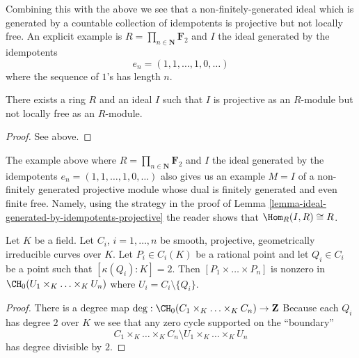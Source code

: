 \medskip\noindent
Combining this with the above we see that a non-finitely-generated
ideal which is generated by a countable collection of idempotents
is projective but not locally free. An explicit example is
$R = \prod_{n \in \mathbf{N}} \mathbf{F}_2$ and
$I$ the ideal generated by the idempotents
$$
e_n = (1, 1, \ldots, 1, 0, \ldots )
$$
where the sequence of $1$'s has length $n$.

\begin{lemma}
\label{lemma-ideal-projective-not-locally-free}
There exists a ring $R$ and an ideal $I$ such that $I$ is projective as
an $R$-module but not locally free as an $R$-module.
\end{lemma}

\begin{proof}
See above.
\end{proof}

\begin{remark}
\label{remark-projective-with-dual-finite-not-finite}
The example above where $R = \prod_{n \in \mathbf{N}} \mathbf{F}_2$ and
$I$ the ideal generated by the idempotents
$e_n = (1, 1, \ldots, 1, 0, \ldots )$ also gives us an example $M = I$
of a non-finitely generated projective module whose dual is finitely
generated and even finite free. Namely, using the strategy in the proof of
Lemma \ref{lemma-ideal-generated-by-idempotents-projective}
the reader shows that $\Hom_R(I, R) \cong R$.
\end{remark}

\begin{lemma}
\label{lemma-chow-group-product}
Let $K$ be a field.
Let $C_i$, $i = 1, \ldots, n$ be smooth, projective, geometrically irreducible
curves over $K$. Let $P_i \in C_i(K)$ be a rational point and
let $Q_i \in C_i$ be a point such that $[\kappa(Q_i) : K] = 2$.
Then $[P_1 \times \ldots \times P_n]$ is nonzero in
$\CH_0(U_1 \times_K \ldots \times_K U_n)$ where $U_i = C_i \setminus \{Q_i\}$.
\end{lemma}

\begin{proof}
There is a degree map
$\deg : \CH_0(C_1 \times_K \ldots \times_K C_n) \to \mathbf{Z}$
Because each $Q_i$ has degree $2$ over $K$ we see that
any zero cycle supported on the ``boundary''
$$
C_1 \times_K \ldots \times_K C_n
\setminus
U_1 \times_K \ldots \times_K U_n
$$
has degree divisible by $2$.
\end{proof}

